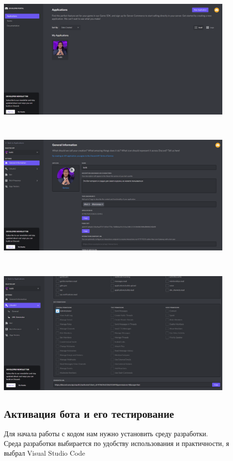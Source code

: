 \documentclass[a4paper,12pt]{article}
\begin{document}
\centerline{\includegraphics[width = 450px]{pictures/application.png}} \\
\vspace{5mm}
\centerline{\includegraphics[width = 450px]{pictures/bot.png}} \\
\vspace{5mm}
\centerline{\includegraphics[width = 450px]{pictures/oauth2.png}}


\newpage
\subsection{Активация бота и его тестирование}
\noindent
Для начала работы с кодом нам нужно установить среду разработки. \\ 
Среда разработки выбирается по удобству использования и практичности, я выбрал Visual Studio Code \\
\end{document}
